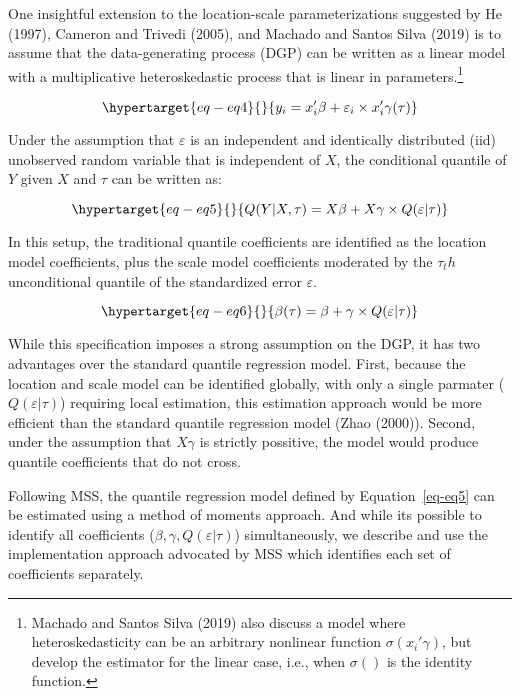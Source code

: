 \documentclass[
  letterpaper,
  DIV=11,
  numbers=noendperiod]{scrartcl}
\begin{document}
One insightful extension to the location-scale parameterizations
suggested by He (1997), Cameron and Trivedi (2005), and Machado and
Santos Silva (2019) is to assume that the data-generating process (DGP)
can be written as a linear model with a multiplicative heteroskedastic
process that is linear in parameters.\footnote{Machado and Santos Silva
  (2019) also discuss a model where heteroskedasticity can be an
  arbitrary nonlinear function \(\sigma(x_i'\gamma)\), but develop the
  estimator for the linear case, i.e., when \(\sigma()\) is the identity
  function.}

\begin{equation}\protect\hypertarget{eq-eq4}{}{y_i=x_i'\beta+\varepsilon_i \times x_i'\gamma(\tau)
}\label{eq-eq4}\end{equation}

Under the assumption that \(\varepsilon\) is an independent and
identically distributed (iid) unobserved random variable that is
independent of \(X\), the conditional quantile of \(Y\) given \(X\) and
\(\tau\) can be written as:

\begin{equation}\protect\hypertarget{eq-eq5}{}{Q(Y|X,\tau) =X\beta+X\gamma \times Q(\varepsilon|\tau)
}\label{eq-eq5}\end{equation}

In this setup, the traditional quantile coefficients are identified as
the location model coefficients, plus the scale model coefficients
moderated by the \(\tau_th\) unconditional quantile of the standardized
error \(\varepsilon\).

\begin{equation}\protect\hypertarget{eq-eq6}{}{\beta(\tau) = \beta + \gamma \times Q(\varepsilon|\tau)
}\label{eq-eq6}\end{equation}

While this specification imposes a strong assumption on the DGP, it has
two advantages over the standard quantile regression model. First,
because the location and scale model can be identified globally, with
only a single parmater (\(Q(\varepsilon|\tau)\)) requiring local
estimation, this estimation approach would be more efficient than the
standard quantile regression model (Zhao (2000)). Second, under the
assumption that \(X\gamma\) is strictly possitive, the model would
produce quantile coefficients that do not cross.

Following MSS, the quantile regression model defined by
Equation~\ref{eq-eq5} can be estimated using a method of moments
approach. And while its possible to identify all coefficients
(\(\beta,\gamma, Q(\varepsilon|\tau)\)) simultaneously, we describe and
use the implementation approach advocated by MSS which identifies each
set of coefficients separately.
\end{document}
